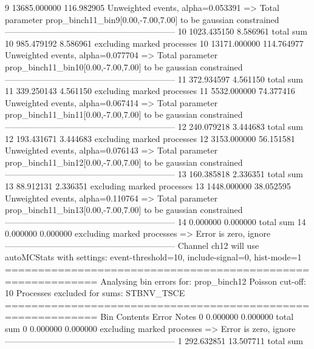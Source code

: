 9          13685.000000    116.982905      Unweighted events, alpha=0.053391
  => Total parameter prop_binch11_bin9[0.00,-7.00,7.00] to be gaussian constrained
------------------------------------------------------------
10         1023.435150     8.586961        total sum                     
10         985.479192      8.586961        excluding marked processes    
10         13171.000000    114.764977      Unweighted events, alpha=0.077704
  => Total parameter prop_binch11_bin10[0.00,-7.00,7.00] to be gaussian constrained
------------------------------------------------------------
11         372.934597      4.561150        total sum                     
11         339.250143      4.561150        excluding marked processes    
11         5532.000000     74.377416       Unweighted events, alpha=0.067414
  => Total parameter prop_binch11_bin11[0.00,-7.00,7.00] to be gaussian constrained
------------------------------------------------------------
12         240.079218      3.444683        total sum                     
12         193.431671      3.444683        excluding marked processes    
12         3153.000000     56.151581       Unweighted events, alpha=0.076143
  => Total parameter prop_binch11_bin12[0.00,-7.00,7.00] to be gaussian constrained
------------------------------------------------------------
13         160.385818      2.336351        total sum                     
13         88.912131       2.336351        excluding marked processes    
13         1448.000000     38.052595       Unweighted events, alpha=0.110764
  => Total parameter prop_binch11_bin13[0.00,-7.00,7.00] to be gaussian constrained
------------------------------------------------------------
14         0.000000        0.000000        total sum                     
14         0.000000        0.000000        excluding marked processes    
  => Error is zero, ignore      
------------------------------------------------------------
Channel ch12 will use autoMCStats with settings: event-threshold=10, include-signal=0, hist-mode=1
============================================================
Analysing bin errors for: prop_binch12
Poisson cut-off: 10
Processes excluded for sums: STBNV_TSCE
============================================================
Bin        Contents        Error           Notes                         
0          0.000000        0.000000        total sum                     
0          0.000000        0.000000        excluding marked processes    
  => Error is zero, ignore      
------------------------------------------------------------
1          292.632851      13.507711       total sum                     
